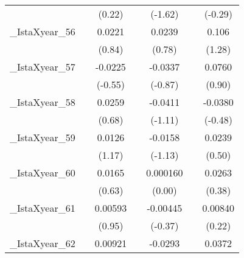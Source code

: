 {\begin{tabular}{l*{6}{c}}
            &                     &      (0.22)         &                     &     (-1.62)         &                     &     (-0.29)         \\
[1em]
\_IstaXyear\_56&                     &      0.0221         &                     &      0.0239         &                     &       0.106         \\
            &                     &      (0.84)         &                     &      (0.78)         &                     &      (1.28)         \\
[1em]
\_IstaXyear\_57&                     &     -0.0225         &                     &     -0.0337         &                     &      0.0760         \\
            &                     &     (-0.55)         &                     &     (-0.87)         &                     &      (0.90)         \\
[1em]
\_IstaXyear\_58&                     &      0.0259         &                     &     -0.0411         &                     &     -0.0380         \\
            &                     &      (0.68)         &                     &     (-1.11)         &                     &     (-0.48)         \\
[1em]
\_IstaXyear\_59&                     &      0.0126         &                     &     -0.0158         &                     &      0.0239         \\
            &                     &      (1.17)         &                     &     (-1.13)         &                     &      (0.50)         \\
[1em]
\_IstaXyear\_60&                     &      0.0165         &                     &    0.000160         &                     &      0.0263         \\
            &                     &      (0.63)         &                     &      (0.00)         &                     &      (0.38)         \\
[1em]
\_IstaXyear\_61&                     &     0.00593         &                     &    -0.00445         &                     &     0.00840         \\
            &                     &      (0.95)         &                     &     (-0.37)         &                     &      (0.22)         \\
[1em]
\_IstaXyear\_62&                     &     0.00921         &                     &     -0.0293         &                     &      0.0372         \\

\end{tabular}}

